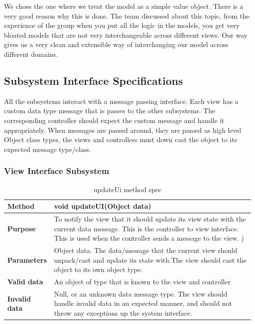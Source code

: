 \documentclass[12pt]{article}
\begin{document}
We chose the one where we treat the model as a simple value object. There is a very good reason why this is done. The team discussed about this topic, from the experience of the group when you put all the logic in the models, you get very bloated models that are not very interchangeable across different views. Our way gives us a very clean and extensible way of interchanging our model across different domains. 



\subsection{Subsystem Interface Specifications}
All the subsystems interact with a message passing interface. Each view has a custom data type message that is passes to the other subsystems. The corresponding controller should expect the custom message and handle it appropriately. When messages are passed around, they are passed as high level Object class types, the views and controllers must down cast the object to its expected message type/class.

\subsubsection{View Interface Subsystem}

\begin{table}[H]
  \caption{updateUi method spec}
  \begin{center}
    \begin{tabular}{|l|p{10cm}|}

      \hline
      \bf Method & void updateUI(Object data)\\
		\hline
      \bf Purpose & To notify the view that it should update its view state with the current data message.
This is the controller to view interface. This is used when the controller sends a message to the view.
)\\
\hline
      \bf Parameters & Object data. The data/message that the current view should unpack/cast and update its state with.The view should cast the object to its own object type.\\
		\hline
      \bf Valid data &  An object of type that is known to the view and controller\\
      \hline
      \bf Invalid data &  Null, or an unknown data message type. The view should handle invalid data in an expected manner, and should not throw any exceptions up the system interface.\\
      \hline

    \end{tabular}
  \end{center}
\end{table}
\end{document}
